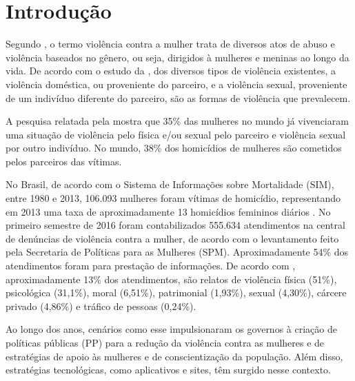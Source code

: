 \chapter[Introdução]{Introdução} \label{cap:introducao}

Segundo , o termo violência contra a mulher trata de
diversos atos de abuso e violência baseados no gênero, ou seja, dirigidos à mulheres e meninas ao longo da vida.
De acordo com o estudo da , dos diversos tipos de violência existentes, a violência doméstica, ou proveniente do parceiro,
e a violência sexual, proveniente de um indivíduo diferente do parceiro, são as formas de violência que prevalecem.

A pesquisa relatada pela  mostra que 35\% das mulheres no mundo já vivenciaram uma situação
de violência pelo física e/ou sexual pelo parceiro e violência sexual por outro indivíduo. No mundo, 38\% dos homicídios de mulheres são cometidos pelos parceiros das vítimas.

No Brasil, de acordo com o Sistema de Informações sobre Mortalidade (SIM), entre 1980 e 2013, 106.093 mulheres foram vítimas de homicídio, representando em 2013 uma taxa de aproximadamente 13 homicídios femininos
diários \cite{mapa_violencia_2015}. 
No primeiro semestre de 2016 foram contabilizados 555.634 atendimentos na central de denúncias 
de violência contra a mulher, de acordo com o levantamento feito pela Secretaria de Políticas para as Mulheres (SPM). 
Aproximadamente 54\% dos atendimentos foram para prestação de informações. De acordo com \cite{portal_180}, aproximadamente 13\% dos atendimentos, são relatos de violência física (51\%), psicológica (31,1\%), moral (6,51\%), patrimonial (1,93\%), sexual (4,30\%), cárcere privado (4,86\%) e tráfico de pessoas (0,24\%).

Ao longo dos anos, cenários como esse impulsionaram os governos à criação de políticas públicas (PP) para a redução da violência contra as mulheres e de estratégias de apoio às mulheres e de conscientização da população. Além disso, estratégias tecnológicas, como aplicativos e sites, têm surgido nesse contexto.


